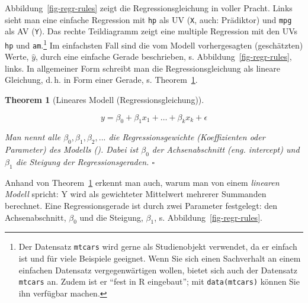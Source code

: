 \documentclass[
  ngerman,
  letterpaper,
  twoside,
  open=any]{scrbook}
\theoremstyle{definition}
\theoremstyle{plain}
\newtheorem{theorem}{Theorem}[chapter]
\theoremstyle{definition}
\theoremstyle{definition}
\theoremstyle{definition}
\theoremstyle{definition}
\theoremstyle{remark}
\begin{document}
Abbildung~\ref{fig-regr-rules} zeigt die Regressionsgleichung in voller
Pracht. Links sieht man eine einfache Regression mit \texttt{hp} als UV
(\texttt{X}, auch: Prädiktor) und \texttt{mpg} als AV (\texttt{Y}). Das
rechte Teildiagramm zeigt eine multiple Regression mit den UVs
\texttt{hp} und \texttt{am}.\footnote{Der Datensatz \texttt{mtcars} wird
  gerne als Studienobjekt verwendet, da er einfach ist und für viele
  Beispiele geeignet. Wenn Sie sich einen Sachverhalt an einem einfachen
  Datensatz vergegenwärtigen wollen, bietet sich auch der Datensatz
  \texttt{mtcars} an. Zudem ist er \enquote{fest in R eingebaut}; mit
  \texttt{data(mtcars)} können Sie ihn verfügbar machen.} Im einfachsten
Fall sind die vom Modell vorhergesagten (geschätzten) Werte,
\(\hat{y}\), durch eine einfache Gerade beschrieben, s.
Abbildung~\ref{fig-regr-rules}, links. In allgemeiner Form schreibt man
die Regressionsgleichung als lineare Gleichung, d.\,h. in Form einer
Gerade, s. Theorem~\ref{thm-lm}.

\begin{theorem}[Lineares Modell
(Regressionsgleichung)]\protect\hypertarget{thm-lm}{}\label{thm-lm}

\[y = \beta_0 + \beta_1 x_1 + \ldots + \beta_k x_k + \epsilon\]

Man nennt alle \(\beta_0, \beta_1, \beta_2, ...\) die
\emph{Regressionsgewichte} (\emph{Koeffizienten} oder \emph{Parameter})
des Modells (). Dabei ist
\(\beta_0\) der \emph{Achsenabschnitt} (eng. intercept) und \(\beta_1\)
die \emph{Steigung} der Regressionsgeraden. \(\square\)

\end{theorem}

Anhand von Theorem~\ref{thm-lm} erkennt man auch, warum man von einem
\emph{linearen Modell} spricht: Y wird als gewichteter Mittelwert
mehrerer Summanden berechnet. Eine Regressionsgerade ist durch zwei
Parameter festgelegt: den Achsenabschnitt, \(\beta_0\) und die Steigung,
\(\beta_1\), s. Abbildung~\ref{fig-regr-rules}.
\end{document}
